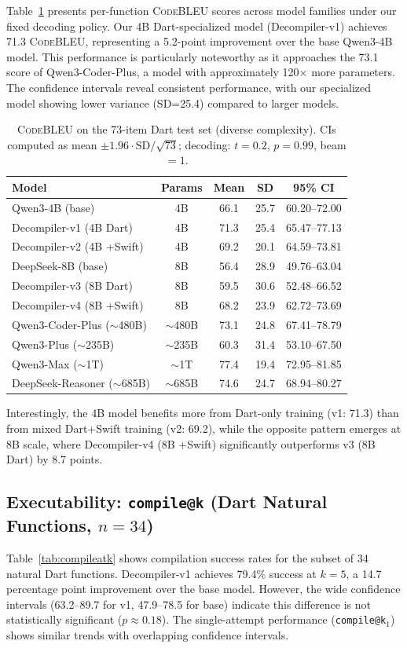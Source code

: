 \documentclass[10pt,conference]{IEEEtran}
\makeatletter
\newcommand{\codebleu}{\textsc{CodeBLEU}\xspace}
\newcommand{\compileatk}{\texttt{compile@k}\xspace}
\makeatother
\begin{document}
Table~\ref{tab:codebleu} presents per-function \codebleu{} scores across model families under our fixed decoding policy. Our 4B Dart-specialized model (Decompiler-v1) achieves 71.3 \codebleu{}, representing a 5.2-point improvement over the base Qwen3-4B model. This performance is particularly noteworthy as it approaches the 73.1 score of Qwen3-Coder-Plus, a model with approximately 120× more parameters. The confidence intervals reveal consistent performance, with our specialized model showing lower variance (SD=25.4) compared to larger models.
\FloatBarrier
\begin{table}[!htbp]
\centering
\caption{\codebleu{} on the 73-item Dart test set (diverse complexity). CIs computed as mean $\pm 1.96 \cdot \mathrm{SD}/\sqrt{73}$; decoding: $t{=}0.2$, $p{=}0.99$, beam $=1$.}
\label{tab:codebleu}
\begin{tabular}{@{}lcccc@{}}
\toprule
\textbf{Model} & \textbf{Params} & \textbf{Mean} & \textbf{SD} & \textbf{95\% CI} \\
\midrule
Qwen3-4B (base) & 4B & 66.1 & 25.7 & 60.20--72.00 \\
Decompiler-v1 (4B Dart) & 4B & 71.3 & 25.4 & 65.47--77.13 \\
Decompiler-v2 (4B +Swift) & 4B & 69.2 & 20.1 & 64.59--73.81 \\
DeepSeek-8B (base) & 8B & 56.4 & 28.9 & 49.76--63.04 \\
Decompiler-v3 (8B Dart) & 8B & 59.5 & 30.6 & 52.48--66.52 \\
Decompiler-v4 (8B +Swift) & 8B & 68.2 & 23.9 & 62.72--73.69 \\
Qwen3-Coder-Plus ($\sim$480B) & $\sim$480B & 73.1 & 24.8 & 67.41--78.79 \\
Qwen3-Plus ($\sim$235B) & $\sim$235B & 60.3 & 31.4 & 53.10--67.50 \\
Qwen3-Max ($\sim$1T) & $\sim$1T & 77.4 & 19.4 & 72.95--81.85 \\
DeepSeek-Reasoner ($\sim$685B) & $\sim$685B & 74.6 & 24.7 & 68.94--80.27 \\
\bottomrule
\end{tabular}
\end{table}

Interestingly, the 4B model benefits more from Dart-only training (v1: 71.3) than from mixed Dart+Swift training (v2: 69.2), while the opposite pattern emerges at 8B scale, where Decompiler-v4 (8B +Swift) significantly outperforms v3 (8B Dart) by 8.7 points.

\subsection{Executability: \compileatk{} (Dart Natural Functions, $n{=}34$)}
Table~\ref{tab:compileatk} shows compilation success rates for the subset of 34 natural Dart functions. Decompiler-v1 achieves 79.4\% success at $k{=}5$, a 14.7 percentage point improvement over the base model. However, the wide confidence intervals (63.2--89.7 for v1, 47.9--78.5 for base) indicate this difference is not statistically significant ($p \approx 0.18$). The single-attempt performance (\compileatk$_1$) shows similar trends with overlapping confidence intervals.
\end{document}
